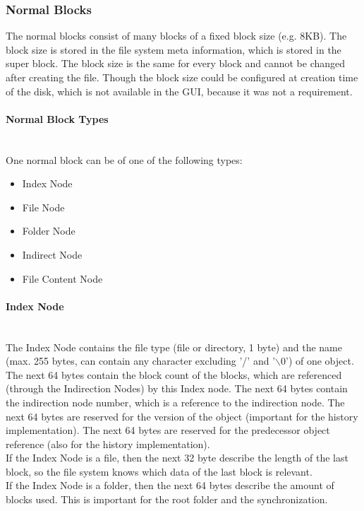 \documentclass[JCDReport.tex]{subfiles}
\begin{document}
\subsubsection{Normal Blocks}

The normal blocks consist of many blocks of a fixed block size (e.g. 8KB). The block size is stored in the file system meta information, which is stored in the super block. The block size is the same for every block and cannot be changed after creating the file. Though the block size could be configured at creation time of the disk, which is not available in the GUI, because it was not a requirement.

\paragraph{Normal Block Types} ~\\

\noindent One normal block can be of one of the following types:

\begin{itemize}
  \item Index Node
    \item File Node
    \item Folder Node
  \item Indirect Node
  \item File Content Node
\end{itemize}

\paragraph{Index Node} ~\\

The Index Node contains the file type (file or directory, 1 byte) and the name (max. 255 bytes, can contain any character excluding '/' and '$\backslash0$') of one object. The next 64 bytes contain the block count of the blocks, which are referenced  (through the Indirection Nodes) by this Index node. The next 64 bytes contain the indirection node number, which is a reference to the indirection node. The next 64 bytes are reserved for the version of the object (important for the history implementation). The next 64 bytes are reserved for the predecessor object reference (also for the history implementation).\\
If the Index Node is a file, then the next 32 byte describe the length of the last block, so the file system knows which data of the last block is relevant.\\
If the Index Node is a folder, then the next 64 bytes describe the amount of blocks used. This is important for the root folder and the synchronization.\\
\end{document}
